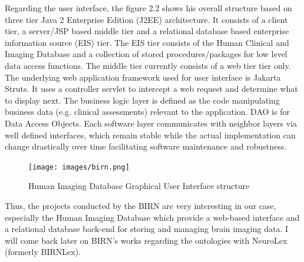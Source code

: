 Regarding the user interface, the figure 2.2 shows his overall structure based on three tier Java 2 Enterprise Edition (J2EE) architecture. It consists of a client tier, a server/JSP based middle tier and a relational database based enterprise information source (EIS) tier. The EIS tier consists of the Human Clinical and Imaging Database and a collection of stored procedures/packages for low level data access functions. The middle tier currently consists of a web tier tier only. The underlying web application framework used for user interface is Jakarta Struts. It uses a controller servlet to intercept a web request and determine what to display next. The business logic layer is defined as the code manipulating business data (e.g. clinical assessments) relevant to the application. DAO is for Data Access Objects. Each software layer communicates with neighbor layers via well defined interfaces, which remain stable while the actual implementation can change drastically over time facilitating software maintenance and robustness.
\begin{figure}[!h]
\begin{center}
\texttt{[image: images/birn.png]}
\caption{\small Human Imaging Database Graphical User Interface structure\protect\footnotemark}
\end{center}
\end{figure}
\par
Thus, the projects conducted by the BIRN are very interesting in our case, especially the Human Imaging Database which provide a web-based interface and a relational database back-end for storing and managing brain imaging data. I will come back later on BIRN's works regarding the ontologies with NeuroLex (formerly BIRNLex).

